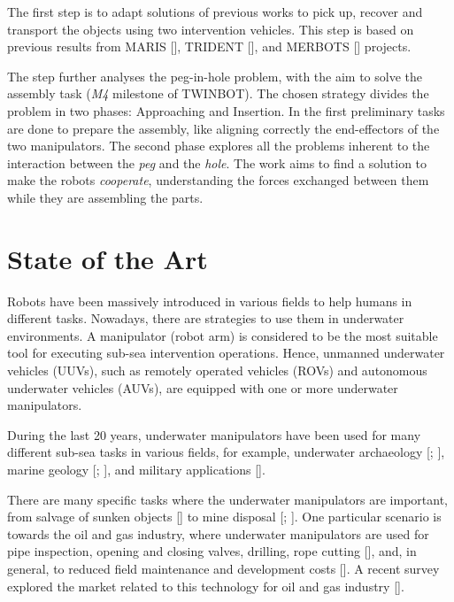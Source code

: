 The first step is to adapt solutions of previous works to pick up, recover and transport the objects using two intervention vehicles. This step is based on previous results from MARIS [\cite{IntroMaris0}], TRIDENT [\cite{AbstractTrident}], and MERBOTS [\cite{AbstractMerbots}] projects.

The step further analyses the peg-in-hole problem, with the aim to solve the assembly task (\textit{M4} milestone of TWINBOT). The chosen strategy divides the problem in two phases: Approaching and Insertion. In the first preliminary tasks are done to prepare the assembly, like aligning correctly the end-effectors of the two manipulators. The second phase explores all the problems inherent to the interaction between the \textit{peg} and the \textit{hole}. The work aims to find a solution to make the robots \textit{cooperate}, understanding the forces exchanged between them while they are assembling the parts.

\section{State of the Art}
Robots have been massively introduced in various fields to help humans in different tasks. Nowadays, there are strategies to use them in underwater environments. A manipulator (robot arm) is considered to be the most suitable tool for executing sub-sea intervention operations. Hence, unmanned underwater vehicles (UUVs), such as remotely operated vehicles (ROVs) and autonomous underwater vehicles (AUVs), are equipped with one or more underwater manipulators.

During the last 20 years, underwater manipulators have been used for many different sub-sea tasks in various fields, for example, underwater archaeology [\cite{IntroApp4}; \cite{IntroApp3}], marine geology [\cite{IntroApp1}; \cite{IntroApp2}], and military applications [\cite{IntroApp5}].

There are many specific tasks where the underwater manipulators are important, from salvage of sunken objects [\cite{IntroSpecApp1}] to mine disposal [\cite{IntroSpecApp2}; \cite{IntroSpecApp3}]. One particular scenario is towards the oil and gas industry, where underwater manipulators are used for pipe inspection, opening and closing valves, drilling, rope cutting [\cite{IntroSpecApp4}], and, in general, to reduced field maintenance and development costs [\cite{IntroSpecApp5}]. A recent survey explored the market related to this technology for oil and gas industry [\cite{IntroSpecApp6}].

